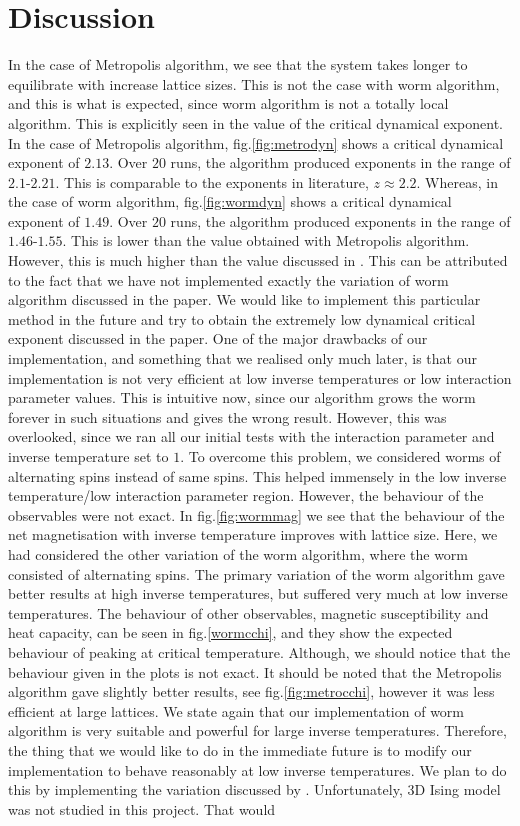 \documentclass[%
reprint,
 amsmath,amssymb,
 aps,
]{revtex4-2}
\begin{document}
\section{Discussion}
In the case of Metropolis algorithm, we see that the system takes longer to equilibrate with increase lattice sizes. This is not the case with worm algorithm, and this is what is expected, since worm algorithm is not a totally local algorithm. This is explicitly seen in the value of the critical dynamical exponent. In the case of Metropolis algorithm, fig.\ref{fig:metrodyn} shows a critical dynamical exponent of $2.13$. Over $20$ runs, the algorithm produced exponents in the range of $2.1$-$2.21$. This is comparable to the exponents in literature, $z \approx 2.2$\cite{metroexp}. Whereas, in the case of worm algorithm, fig.\ref{fig:wormdyn} shows a critical dynamical exponent of $1.49$. Over $20$ runs, the algorithm produced exponents in the range of $1.46$-$1.55$. This is lower than the value obtained with Metropolis algorithm. However, this is much higher than the value discussed in \cite{Prokof_ev_2001}. This can be attributed to the fact that we have not implemented exactly the variation of worm algorithm discussed in the paper. We would like to implement this particular method in the future and try to obtain the extremely low dynamical critical exponent discussed in the paper. One of the major drawbacks of our implementation, and something that we realised only much later, is that our implementation is not very efficient at low inverse temperatures or low interaction parameter values. This is intuitive now, since our algorithm grows the worm forever in such situations and gives the wrong result. However, this was overlooked, since we ran all our initial tests with the interaction parameter and inverse temperature set to $1$. To overcome this problem, we considered worms of alternating spins instead of same spins. This helped immensely in the low inverse temperature/low interaction parameter region. However, the behaviour of the observables were not exact. In fig.\ref{fig:wormmag} we see that the behaviour of the net magnetisation with inverse temperature improves with lattice size. Here, we had considered the other variation of the worm algorithm, where the worm consisted of alternating spins. The primary variation of the worm algorithm gave better results at high inverse temperatures, but suffered very much at low inverse temperatures. The behaviour of other observables, magnetic susceptibility and heat capacity, can be seen in fig.\ref{wormcchi}, and they show the expected behaviour of peaking at critical temperature. Although, we should notice that the behaviour given in the plots is not exact. It should be noted that the Metropolis algorithm gave slightly better results, see fig.\ref{fig:metrocchi}, however it was less efficient at large lattices. We state again that our implementation of worm algorithm is very suitable and powerful for large inverse temperatures. Therefore, the thing that we would like to do in the immediate future is to modify our implementation to behave reasonably at low inverse temperatures. We plan to do this by implementing the variation discussed by \cite{Prokof_ev_2001}. Unfortunately, 3D Ising model was not studied in this project. That would 
\end{document}
